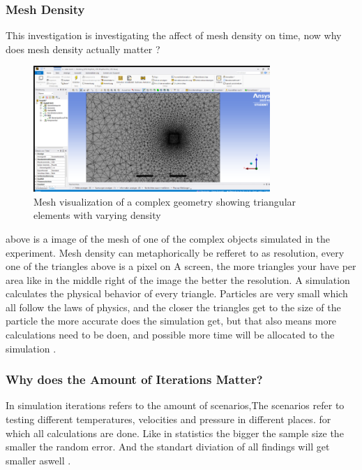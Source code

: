 \documentclass[12pt,a4paper]{article}
\begin{document}
\subsubsection{Mesh Density}

This investigation is investigating the affect of mesh density on time, now why does mesh density actually matter \cite{versteeg2007computational}?

\begin{figure}[H]
    \centering
    \includegraphics[width=0.8\textwidth]{image9.png}
    \caption{Mesh visualization of a complex geometry showing triangular elements with varying density}
    \label{fig:mesh_example}
\end{figure}

above is a image of the mesh of one of the complex objects simulated in the experiment. Mesh density can metaphorically be refferet to as resolution, every one of the triangles above is a pixel on A screen, the more triangles your have per area like in the middle right of the image the better the resolution. A simulation calculates the physical behavior of every triangle. Particles are very small which all follow the laws of physics, and the closer the triangles get to the size of the particle the more accurate does the simulation get, but that also means more calculations need to be doen, and possible more time will be allocated to the simulation \cite{blazek2015computational}.

\subsubsection{Why does the Amount of Iterations Matter?}

In simulation iterations refers to the amount of scenarios,The scenarios refer to testing different temperatures, velocities and pressure in different places. for which all calculations are done. Like in statistics the bigger the sample size the smaller the random error. And the standart diviation of all findings will get smaller aswell \cite{versteeg2007computational}. 
\end{document}
